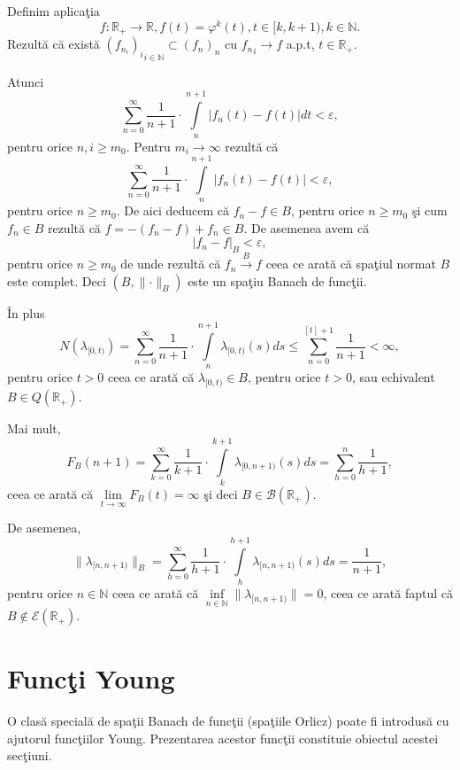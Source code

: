 \documentclass[ a4paper, 12pt]{report}
\theoremstyle{definition}
\theoremstyle{remark}
\numberwithin{equation}{section}
\begin{document}
Definim aplica\c tia
$$f:{\mathbb{R}}_+ \xrightarrow{}  \mathbb{R} , f(t)={ \varphi^k}(t) , t \in[k,k+1), k \in \mathbb{N}.$$
Rezult\u a c\u a exist\u a ${({f_{n_i}})_i}_{i \in \mathbb{N}} \subset (f_n)_n$ cu ${f_n}_i\xrightarrow{}f$ a.p.t, $t \in \mathbb{R}_+.$

Atunci
$$\sum\limits_{n=0}^{\infty}\frac{1}{n+1}\cdot \int\limits_{n}^{n+1}\lvert f_n(t)-f(t)\rvert dt < \varepsilon,$$ pentru orice $n,i\geq m_0.$
Pentru $m_i\xrightarrow{}\infty$ rezult\u a  c\u a
$$\sum\limits_{n=0}^{\infty}\frac{1}{n+1}\cdot \int\limits_{n}^{n+1}
\lvert f_n(t)-f(t) \rvert < \varepsilon,$$ pentru orice $n\geq m_0$.
De aici deducem c\u a $f_n-f \in B$, pentru orice $n\geq m_0$ \c si cum $f_n \in B$ rezult\u a c\u a $f = - (f_n - f) + f_n \in B$. De asemenea
avem c\u a
$$\lvert f_n-f\rvert_B<\varepsilon,$$ pentru orice $n\geq m_0$ de unde rezult\u a c\u a $f_n\xrightarrow{B}f$ ceea ce arat\u a c\u a spa\c tiul normat $B$ este complet. Deci $(B,\lVert \cdot \rVert_B)$ este un spa\c tiu Banach de func\c tii.

\^ In plus
$$N(\lambda_{[0,t)})=\sum\limits_{n=0}^{\infty}\frac{1}{n+1}\cdot \int\limits_{n}^{n+1}\lambda_{[0,t)}(s) ds \leq \sum\limits_{n=0}^{[t]+1}\frac{1}{n+1}<\infty,$$ pentru orice $t > 0$ ceea ce arat\u a c\u a $\lambda_{[0,t)}\in B$, pentru orice $t > 0$, sau echivalent $B\in Q(\mathbb{R}_+)$.

Mai mult,
$$F_B(n+1)=\sum\limits_{k=0}^{\infty}\frac{1}{k+1}\cdot\int\limits_{k}^{k+1}\lambda_{[0,n+1)}(s) ds = \sum\limits_{h=0}^{n}\frac{1}{h+1},$$ ceea ce arat\u a c\u a
$\lim\limits_{t \to \infty} F_B(t) = \infty$ \c si deci $B\in\mathcal{B}(\mathbb{R}_+)$.

De asemenea,
$$\lVert\lambda_{[n,n+1)}\rVert_B = \sum\limits_{h=0}^{\infty}\frac{1}{h+1}\cdot\int\limits_{h}^{h+1}\lambda_{[n,n+1)}(s) ds = \frac{1}{n+1},$$ pentru orice $n \in \mathbb{N}$ ceea ce arat\u a c\u a $\inf\limits_{n \in \mathbb{N}} \lVert \lambda_{[n,n+1)} \rVert = 0$, ceea ce arat\u a faptul c\u a $B \notin \mathcal{E}(\mathbb{R}_+)$.

\newpage


\section{Func\c ti Young}

O clas\u a special\u a de spa\c tii Banach de func\c tii (spa\c tiile Orlicz) poate fi introdus\u a cu ajutorul func\c tiilor Young. Prezentarea acestor func\c tii constituie obiectul acestei sec\c tiuni.
\end{document}
